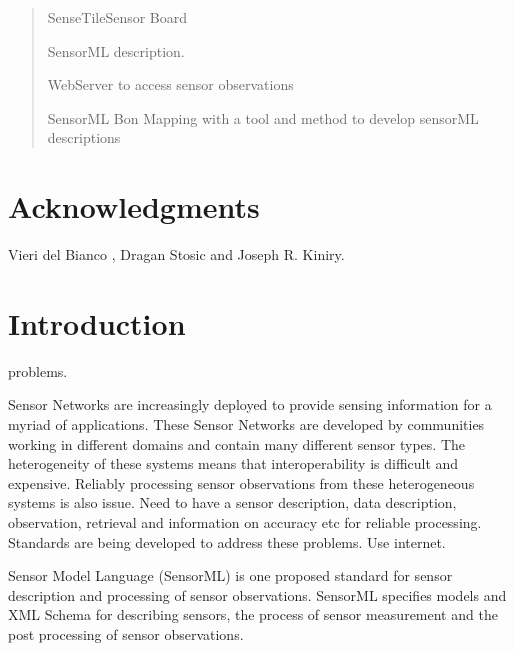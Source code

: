 \documentclass[]{final_report}
\begin{document}
\maketitle
\tableofcontents{}\newpage


\begin{abstract}
SenseTileSensor Board

SensorML description.

WebServer to access sensor observations

SensorML Bon Mapping with a tool and method to develop sensorML descriptions

\end{abstract}




\newpage



\chapter*{Acknowledgments}

Vieri del Bianco , Dragan Stosic and Joseph R. Kiniry.


\chapter{Introduction}

problems.

Sensor Networks are increasingly deployed to provide sensing information for a myriad of applications. These Sensor Networks are developed by communities working in different domains and contain many different sensor types. The heterogeneity of these systems means that interoperability is difficult and expensive. Reliably processing sensor observations from these heterogeneous systems is also issue. Need to have a sensor description, data description, observation, retrieval and information on accuracy etc for reliable processing. Standards are being developed to address these problems. Use internet.

Sensor Model Language (SensorML)\cite{SMLref} is one proposed standard for sensor description and processing of sensor observations. SensorML specifies models and XML Schema for describing sensors, the process of sensor measurement and the post processing of sensor observations. 
\end{document}
